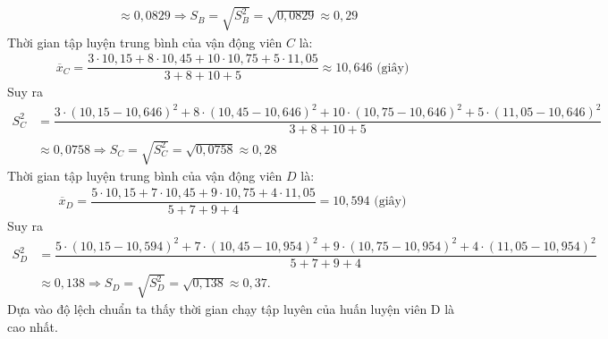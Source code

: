 \begin{bt}
{\begin{align*}
			& \approx 0{,}0829 \Rightarrow {S}_{{B}}=\sqrt{{S}_{{B}}^{2}}=\sqrt{0{,}0829} \approx 0{,}29
		\end{align*}
		Thời gian tập luyện trung bình của vận động viên $C$ là:
		\begin{align*}
			\overline{{x}}_{C}=\dfrac{3 \cdot 10{,}15+8 \cdot 10{,}45+10 \cdot 10{,}75+5 \cdot 11{,}05}{3+8+10+5} \approx 10{,}646 \text{ (giây)}
		\end{align*}
		Suy ra
		\begin{align*}
			{S}_{{C}}^{2} & =\dfrac{3 \cdot(10{,}15-10{,}646)^{2}+8 \cdot(10{,}45-10{,}646)^{2}+10 \cdot(10{,}75-10{,}646)^{2}+5 \cdot(11{,}05-10{,}646)^{2}}{3+8+10+5} \\
			& \approx 0{,}0758 \Rightarrow {S}_{{C}}=\sqrt{{S}_{{C}}^{2}}=\sqrt{0{,}0758} \approx 0{,}28
		\end{align*}
		Thời gian tập luyện trung bình của vận động viên $D$ là:
		\begin{align*}
			\overline{{x}}_{{D}}=\dfrac{5 \cdot 10,15+7 \cdot 10,45+9 \cdot 10,75+4 \cdot 11,05}{5+7+9+4}=10,594  \text{ (giây)}
		\end{align*}
		Suy ra
		\begin{align*}
			{S}_{D}^{2} & =\dfrac{5 \cdot(10,15-10,594)^{2}+7 \cdot(10,45-10,954)^{2}+9 \cdot(10,75-10,954)^{2}+4 \cdot(11,05-10,954)^{2}}{5+7+9+4} \\
			& \approx 0,138 \Rightarrow {S}_{D}=\sqrt{{S}_{D}^{2}}=\sqrt{0,138} \approx 0,37.
		\end{align*}
		Dựa vào độ lệch chuẩn ta thấy thời gian chạy tập luyên của huấn luyện viên D là cao nhất.
	}
\end{bt}

